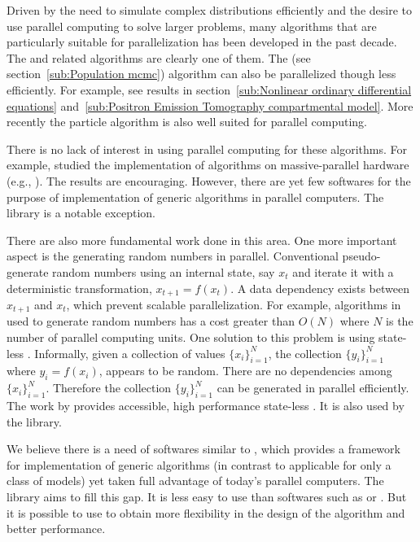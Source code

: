 Driven by the need to simulate complex distributions efficiently and the
desire to use parallel computing to solve larger problems, many algorithms
that are particularly suitable for parallelization has been developed in the
past decade. The \smc and related algorithms are clearly one of them. The
\pmcmc (see section~\ref{sub:Population mcmc}) algorithm can also be
parallelized though less efficiently. For example, see results in
section~\ref{sub:Nonlinear ordinary differential equations}
and~\ref{sub:Positron Emission Tomography compartmental model}. More recently
the particle \mcmc algorithm \cite{Andrieu:2010gc} is also well suited for
parallel computing.

There is no lack of interest in using parallel computing for these algorithms.
For example, \cite{Lee:2010fm} studied the implementation of \smc algorithms
on massive-parallel hardware (e.g., \gpu). The results are encouraging.
However, there are yet few softwares for the purpose of implementation of
generic \smc algorithms in parallel computers. The \libbi library is a notable
exception.

There are also more fundamental work done in this area. One more important
aspect is the generating random numbers in parallel. Conventional pseudo-\rng
generate random numbers using an internal state, say $x_t$ and iterate it with
a deterministic transformation, $x_{t+1} = f(x_t)$. A data dependency exists
between $x_{t+1}$ and $x_t$, which prevent scalable parallelization. For
example, algorithms in \cite{Lee:2010fm} used to generate random numbers has a
cost greater than $O(N)$ where $N$ is the number of parallel computing units.
One solution to this problem is using state-less \rng. Informally, given a
collection of values $\{x_i\}_{i=1}^N$, the collection $\{y_i\}_{i=1}^N$ where
$y_i = f(x_i)$, appears to be random. There are no dependencies among
$\{x_i\}_{i=1}^N$. Therefore the collection $\{y_i\}_{i=1}^N$ can be generated
in parallel efficiently. The work by \cite{Salmon:2011um} provides accessible,
high performance state-less \rng. It is also used by the \vsmc library.

We believe there is a need of softwares similar to \smctc, which provides a
framework for implementation of generic \smc algorithms (in contrast to
applicable for only a class of models) yet taken full advantage of today's
parallel computers. The \vsmc library aims to fill this gap. It is less easy
to use than softwares such as \libbi or \biips. But it is possible to use to
obtain more flexibility in the design of the algorithm and better performance.

